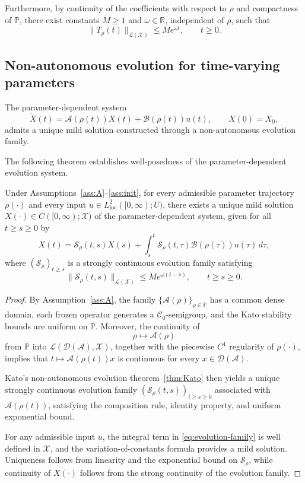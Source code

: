 \documentclass[AMA,Times2COL]{WileyNJDv5}
\begin{document}
Furthermore, by continuity of the coefficients with respect to \(\rho\) and compactness of \(\mathbb P\), there exist constants \(M\ge1\) and \(\omega\in\mathbb R\), independent of \(\rho\), such that
\[
\|T_\rho(t)\|_{\mathcal L(\mathscr X)}
\le
M e^{\omega t},
\qquad t\ge0.
\]

\subsection{Non-autonomous evolution for time-varying parameters}

The parameter-dependent system
\begin{equation}
\dot X(t)=\mathcal{A}(\rho(t))X(t)+\mathcal{B}(\rho(t))u(t),
\qquad X(0)=X_0,
\end{equation}
admits a unique mild solution constructed through a non-autonomous evolution family.

The following theorem establishes well-posedness of the parameter-dependent evolution system.

\begin{theorem}
\label{thm:wellposed}
Under Assumptions~\ref{ass:A}--\ref{ass:init}, for every admissible parameter trajectory $\rho(\cdot)$ and every input $u\in L^2_{\mathrm{loc}}([0,\infty);U)$, there exists a unique mild solution
\(
X(\cdot)\in C([0,\infty);\mathscr{X})
\)
of the parameter-dependent system, given for all $t\ge s\ge0$ by
\begin{equation}\label{eq:evolution-family}
X(t)=\mathcal{S}_{\rho}(t,s)X(s)
+\int_s^t
\mathcal{S}_\rho(t,\tau)\mathcal{B}(\rho(\tau))u(\tau)\,d\tau,
\end{equation}
where $(\mathcal{S}_{\rho})_{t\ge s}$ is a strongly continuous evolution family
satisfying
\[
\|\mathcal{S}_{\rho}(t,s)\|_{\mathcal{L}(\mathscr{X})}
\le M e^{\omega(t-s)}, \qquad t\ge s\ge0.
\]
\end{theorem}

\begin{proof}
By Assumption~\ref{ass:A}, the family
$\{\mathcal{A}(\rho)\}_{\rho\in\mathbb P}$ has a common dense domain, each frozen operator generates a $\mathcal C_0$-semigroup, and the Kato stability bounds are uniform on $\mathbb P$.
Moreover, the continuity of
\[
\rho\mapsto\mathcal A(\rho)
\]
from $\mathbb P$ into
$\mathcal L(\mathcal D(\mathcal A),\mathscr X)$, together with the piecewise
$C^1$ regularity of $\rho(\cdot)$, implies that
$t\mapsto\mathcal A(\rho(t))x$ is continuous for every
$x\in\mathcal D(\mathcal A)$.

Kato's non-autonomous evolution theorem~\ref{thm:Kato} then yields a unique strongly continuous evolution family
$(\mathcal S_{\rho}(t,s))_{t\ge s\ge0}$ associated with
$\mathcal A(\rho(t))$, satisfying the composition rule, identity property, and uniform exponential bound.

For any admissible input $u$, the integral term in
\eqref{eq:evolution-family} is well defined in $\mathscr{X}$, and the variation-of-constants formula provides a mild solution. Uniqueness follows
from linearity and the exponential bound on $\mathcal{S}_{\rho}$, while continuity of $X(\cdot)$ follows from the strong continuity of the evolution
family.
\end{proof}
\end{document}
